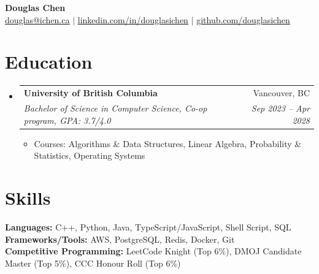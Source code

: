 \documentclass[letterpaper,11pt]{article}
\makeatletter
\newcommand{\resumeItem}[1]{
  \item\small{
    {#1 \vspace{-0.6pt}}
  }
}
\newcommand{\resumeSubheading}[4]{
  \vspace{0pt}\item
    \begin{tabular*}{0.97\textwidth}[t]{l@{\extracolsep{\fill}}r}
      \textbf{#1} & #2 \\
      \textit{\small#3} & \textit{\small #4} \\
    \end{tabular*}\vspace{-7pt}
}
\newcommand{\resumeSubHeadingListStart}{\begin{itemize}[leftmargin=0.15in, label={}]}
\newcommand{\resumeSubHeadingListEnd}{\end{itemize}}
\newcommand{\resumeItemListStart}{\begin{itemize}}
\newcommand{\resumeItemListEnd}{\end{itemize}\vspace{-7pt}}
\makeatother
\begin{document}
\begin{center}
    \textbf{\Huge Douglas Chen} \\ \vspace{1pt}
    \href{mailto:douglas@ichen.ca}{\underline{douglas@ichen.ca}} $|$
    \href{https://www.linkedin.com/in/douglasichen/}{\underline{linkedin.com/in/douglasichen}} $|$
    \href{https://www.github.com/douglasichen}{\underline{github.com/douglasichen}}
\end{center}

\section{Education}
  \resumeSubHeadingListStart
    \resumeSubheading
      {University of British Columbia}{Vancouver, BC}
      {Bachelor of Science in Computer Science, Co-op program, GPA: 3.7/4.0}{Sep 2023 -- Apr 2028}
      \resumeItemListStart
        \resumeItem{Courses: Algorithms \& Data Structures, Linear Algebra, Probability \& Statistics, Operating Systems}
      \resumeItemListEnd
  \resumeSubHeadingListEnd

\section{Skills}
 \begin{itemize}[leftmargin=0.15in, label={}]
    \small{\item{
         \textbf{Languages:}{ C++, Python, Java, TypeScript/JavaScript, Shell Script, SQL} \\
     \textbf{Frameworks/Tools:}{ AWS, PostgreSQL, Redis, Docker, Git} \\
     \textbf{Competitive Programming:}{ LeetCode Knight (Top 6\%), DMOJ Candidate Master (Top 5\%), CCC Honour Roll (Top 6\%)}
    }}
 \end{itemize}
\end{document}
